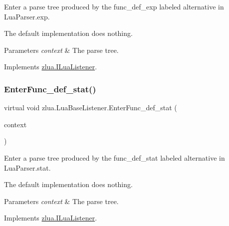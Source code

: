 Enter a parse tree produced by the {\ttfamily func\+\_\+def\+\_\+exp} labeled alternative in Lua\+Parser.\+exp. 

The default implementation does nothing.


\begin{DoxyParams}{Parameters}
{\em context} & The parse tree.\\
\hline
\end{DoxyParams}


Implements \mbox{\hyperlink{interfacezlua_1_1_i_lua_listener_a4f05c6d0e5bd9d2515029fd34d8f5402}{zlua.\+I\+Lua\+Listener}}.

\mbox{\label{classzlua_1_1_lua_base_listener_ae342d4559800c58b6cfc9e42d5ba2837}} 
\subsubsection{\texorpdfstring{Enter\+Func\+\_\+def\+\_\+stat()}{EnterFunc\_def\_stat()}}
{\footnotesize\ttfamily virtual void zlua.\+Lua\+Base\+Listener.\+Enter\+Func\+\_\+def\+\_\+stat (\begin{DoxyParamCaption}\item[{\mbox{[}\+Not\+Null\mbox{]} \mbox{\hyperlink{classzlua_1_1_lua_parser_1_1_func__def__stat_context}{Lua\+Parser.\+Func\+\_\+def\+\_\+stat\+Context}}}]{context }\end{DoxyParamCaption})\hspace{0.3cm}{\ttfamily [virtual]}}



Enter a parse tree produced by the {\ttfamily func\+\_\+def\+\_\+stat} labeled alternative in Lua\+Parser.\+stat. 

The default implementation does nothing.


\begin{DoxyParams}{Parameters}
{\em context} & The parse tree.\\
\hline
\end{DoxyParams}


Implements \mbox{\hyperlink{interfacezlua_1_1_i_lua_listener_a2f03132612731ef3355f1453b3cb4686}{zlua.\+I\+Lua\+Listener}}.

\mbox{\label{classzlua_1_1_lua_base_listener_a3e3c9ea85f3429d18fb56ed19476c5d3}} 
